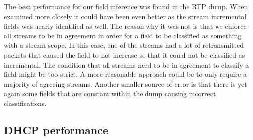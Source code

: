 \documentclass[a4paper]{report}
\begin{document}
The best performance for our field inference was found in the RTP dump. When
examined more closely it could have been even better as the stream incremental
fields was nearly identified as well. The reason why it was not is that we
enforce all streams to be in agreement in order for a field to be classified as
something with a stream scope. In this case, one of the streams had a lot of
retransmitted packets that caused the field to not increase so that it could
not be classified as incremental. The condition that all streams need to be in
agreement to classify a field might be too strict. A more reasonable approach
could be to only require a majority of agreeing streams. Another smaller source
of error is that there is yet again some fields that are constant within the
dump causing incorrect classifications.

\subsection{DHCP performance}
\end{document}

